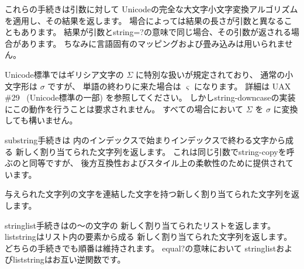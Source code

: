 \begin{entry}{%
}


これらの手続きは引数に対して
Unicodeの完全な大文字小文字変換アルゴリズム
を適用し、その結果を返します。
場合によっては結果の長さが引数と異なることもあります。
結果が引数と{\cf string=?}の意味で同じ場合、その引数が返される場合があります。
ちなみに言語固有のマッピングおよび畳み込みは用いられません。

Unicode標準ではギリシア文字の $\Sigma$ に特別な扱いが規定されており、
通常の小文字形は $\sigma$ ですが、
単語の終わりに来た場合は $\varsigma$ になります。
詳細は UAX \#29~\cite{uax29} (Unicode標準の一部) を参照してください。
しかし{\cf string-downcase}の実装にこの動作を行うことは要求されません。
すべての場合において $\Sigma$ を $\sigma$ に変換しても構いません。

\end{entry}


\begin{entry}{%
}

{\cf substring}手続きは
内のインデックスで始まりインデックスで終わる文字から成る
新しく割り当てられた文字列を返します。
これは同じ引数で{\cf string-copy}を呼ぶのと同等ですが、
後方互換性およびスタイル上の柔軟性のために提供されています。
\end{entry}


\begin{entry}{%
}

与えられた文字列の文字を連結した文字を持つ新しく割り当てられた文字列を返します。

\end{entry}


\begin{entry}{%
}

{\cf string\coerce{}list}手続きはの〜の文字の
新しく割り当てられたリストを返します。
{\cf list\coerce{}string}はリスト内の要素から成る
新しく割り当てられた文字列を返します。
どちらの手続きでも順番は維持されます。
{\cf equal?}の意味において
{\cf string\coerce{}list}および{\cf list\coerce{}string}はお互い逆関数です。

\end{entry}


